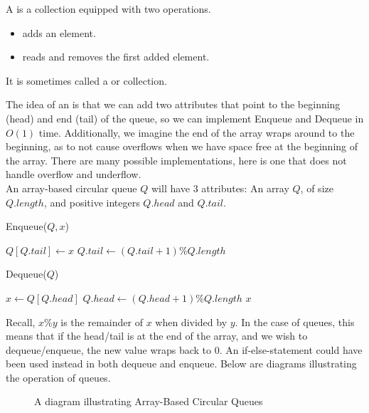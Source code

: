 \documentclass[11pt]{report}
\begin{document}
\begin{defi}[Queue]
    A  is a collection equipped with two operations.
    \begin{itemize}
        \item {} adds an element.
        \item {} reads and removes the first added element.
    \end{itemize}
    It is sometimes called a  or  collection. 
\end{defi}
\begin{impl}
    The idea of an  is that we can add two attributes that point to the beginning (head) and end (tail) of the queue, so we can implement Enqueue and Dequeue in $O(1)$ time. Additionally, we imagine the end of the array wraps around to the beginning, as to not cause overflows when we have space free at the beginning of the array. There are many possible implementations, here is one that does not handle overflow and underflow.
    \\ An array-based circular queue $Q$ will have 3 attributes: An array $Q$, of size $Q.length$, and positive integers $Q.head$ and $Q.tail$.\mypar
    \begin{algorithm}[H]
        \caption{Enqueue($Q, x$)}
        $Q[Q.tail] \gets x$\;
        $Q.tail \gets (Q.tail + 1)\%Q.length$\;
    \end{algorithm}
    \begin{algorithm}[H]
        \caption{Dequeue($Q$)}
        $x \gets Q[Q.head]$\;
        $Q.head \gets (Q.head + 1)\%Q.length$\;
        \Return $x$\;
    \end{algorithm}
    Recall, $x\%y$ is the remainder of $x$ when divided by $y$. In the case of queues, this means that if the head/tail is at the end of the array, and we wish to dequeue/enqueue, the new value wraps back to 0. An if-else-statement could have been used instead in both dequeue and enqueue.
    \mypar Below are diagrams illustrating the operation of queues.
    \begin{figure}[H]
        \caption{A diagram illustrating Array-Based Circular Queues}
        \centering
\end{figure}
\end{impl}
\end{document}
